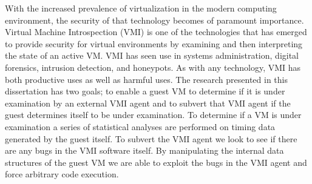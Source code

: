 With the increased prevalence of virtualization in the modern computing environment, the security of that technology becomes of paramount importance. Virtual Machine Introspection (VMI) is one of the technologies that has emerged to provide security for virtual environments by examining and then interpreting the state of an active VM. VMI has seen use in systems administration, digital forensics, intrusion detection, and honeypots. As with any technology, VMI has both productive uses as well as harmful uses. The research presented in this dissertation has two goals; to enable a guest VM to determine if it is under examination by an external VMI agent and to subvert that VMI agent if the guest determines itself to be under examination. To determine if a VM is under examination a series of statistical analyses are performed on timing data generated by the guest itself. To subvert the VMI agent we look to see if there are any bugs in the VMI software itself. By manipulating the internal data structures of the guest VM we are able to exploit the bugs in the VMI agent and force arbitrary code execution.